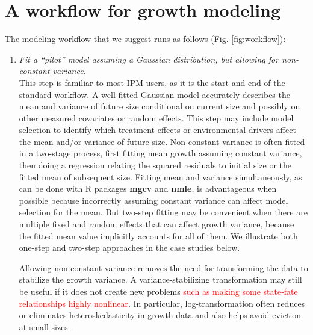 \documentclass[12pt]{article}
\newcommand{\new}{\textcolor{red}}
\begin{document}
\section{A workflow for growth modeling}
The modeling workflow that we suggest runs as follows (Fig. \ref{fig:workflow}):
\begin{enumerate}[label=\arabic*., listparindent=1.5em]
\item \textit{Fit a ``pilot'' model assuming a Gaussian distribution, but allowing for non-constant variance.}
\\ 
This step is familiar to most IPM users, as it is the start and end of the standard workflow. 
A well-fitted Gaussian model accurately describes the mean and variance of future size conditional on current size and possibly on other measured covariates or random effects. 
This step may include model selection to identify which treatment effects or environmental drivers affect the mean and/or variance of future size. 
Non-constant variance is often fitted in a two-stage process, first fitting mean growth assuming constant variance, then doing a regression relating the squared residuals to initial size or the fitted mean of subsequent size. 
Fitting mean and variance simultaneously, as can be done with R packages \textbf{mgcv} and \textbf{nmle}, is advantageous when possible because incorrectly assuming constant variance can affect model selection for the mean. 
But two-step fitting may be convenient when there are multiple fixed and random effects that can affect growth variance, because the fitted mean value implicitly accounts for all of them. 
We illustrate both one-step and two-step approaches in the case studies below. 

Allowing non-constant variance removes the need for transforming the data to stabilize the growth variance. 
A variance-stabilizing transformation may still be useful if it does not create new problems \new{such as making some state-fate
relationships highly nonlinear}. %
In particular, log-transformation often reduces or eliminates heteroskedasticity in growth data \citep{ellner-etal-2016} 
and also helps avoid eviction at small sizes \citep{williams2012avoiding}. 


\end{enumerate}
\end{document}
